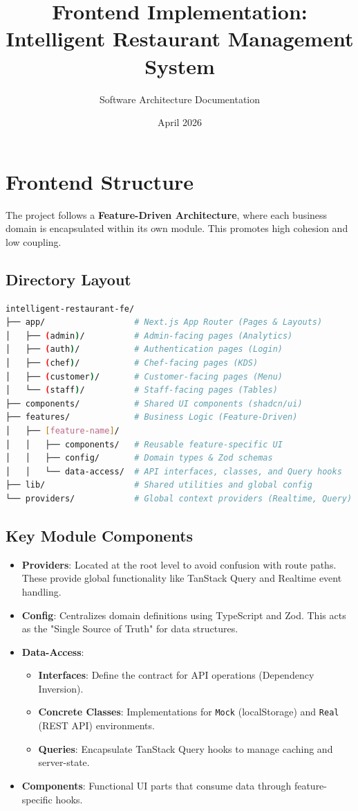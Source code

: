 \documentclass{article}
\title{Frontend Implementation: Intelligent Restaurant Management System}
\author{Software Architecture Documentation}
\date{April 2026}
\begin{document}
\maketitle

\section{Frontend Structure}
The project follows a \textbf{Feature-Driven Architecture}, where each business domain is encapsulated within its own module. This promotes high cohesion and low coupling.

\subsection{Directory Layout}
\begin{lstlisting}[language=bash]
intelligent-restaurant-fe/
├── app/                  # Next.js App Router (Pages & Layouts)
│   ├── (admin)/          # Admin-facing pages (Analytics)
│   ├── (auth)/           # Authentication pages (Login)
│   ├── (chef)/           # Chef-facing pages (KDS)
│   ├── (customer)/       # Customer-facing pages (Menu)
│   └── (staff)/          # Staff-facing pages (Tables)
├── components/           # Shared UI components (shadcn/ui)
├── features/             # Business Logic (Feature-Driven)
│   ├── [feature-name]/
│   │   ├── components/   # Reusable feature-specific UI
│   │   ├── config/       # Domain types & Zod schemas
│   │   └── data-access/  # API interfaces, classes, and Query hooks
├── lib/                  # Shared utilities and global config
└── providers/            # Global context providers (Realtime, Query)
\end{lstlisting}

\subsection{Key Module Components}
\begin{itemize}
    \item \textbf{Providers}: Located at the root level to avoid confusion with route paths. These provide global functionality like TanStack Query and Realtime event handling.
    \item \textbf{Config}: Centralizes domain definitions using TypeScript and Zod. This acts as the "Single Source of Truth" for data structures.
    \item \textbf{Data-Access}:
    \begin{itemize}
        \item \textbf{Interfaces}: Define the contract for API operations (Dependency Inversion).
        \item \textbf{Concrete Classes}: Implementations for \texttt{Mock} (localStorage) and \texttt{Real} (REST API) environments.
        \item \textbf{Queries}: Encapsulate TanStack Query hooks to manage caching and server-state.
    \end{itemize}
    \item \textbf{Components}: Functional UI parts that consume data through feature-specific hooks.
\end{itemize}
\end{document}
